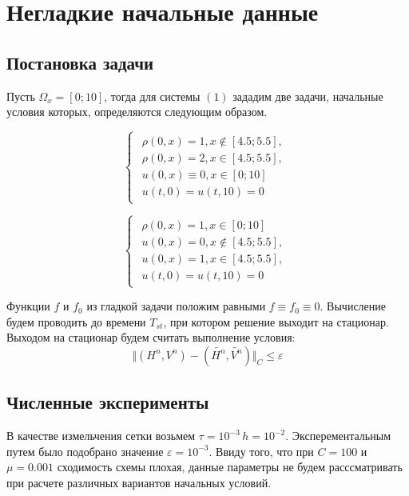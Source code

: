 \newpage
\section{Негладкие начальные данные}
\subsection{Постановка задачи}

Пусть $\Omega_x=[0;10]$, тогда для системы $(1)$ зададим две задачи, начальные условия которых, определяются следующим образом.

\begin{equation}
	\begin{cases}
		\begin{array}{l}
			\rho(0, x) = 1, x \notin [4.5;5.5], \\
			\rho(0, x) = 2, x \in [4.5;5.5], \\
			u(0, x) \equiv 0, x\in [0;10]\\
			u(t, 0) = u(t, 10) = 0
		\end{array}
	\end{cases}
\end{equation}

\begin{equation}
	\begin{cases}
		\begin{array}{l}
			\rho(0, x) = 1, x \in [0;10]\\
			u(0, x) = 0, x \notin [4.5;5.5], \\
			u(0, x) = 1, x \in [4.5;5.5], \\
			u(t, 0) = u(t, 10) = 0
		\end{array}
	\end{cases}
\end{equation}

Функции $f$ и $f_0$ из гладкой задачи положим равными $f \equiv f_0 \equiv 0$. Вычисление будем проводить до времени $T_{st}$, при котором решение выходит на стационар. Выходом на стационар будем считать выполнение условия:
$$
\Vert (H^n, V^n) - (\tilde{H^n}, \tilde{V^n}) \Vert_C \leq \varepsilon
$$

\subsection{Численные эксперименты}
В качестве измельчения сетки возьмем $\tau = 10^{-3} \, h = 10^{-2}$. Эксперементальным путем было подобрано значение $\varepsilon = 10^{-3}$. Ввиду того, что при $C = 100$ и $\mu = 0.001$ сходимость схемы плохая, данные параметры не будем расссматривать при расчете различных вариантов начальных условий.


